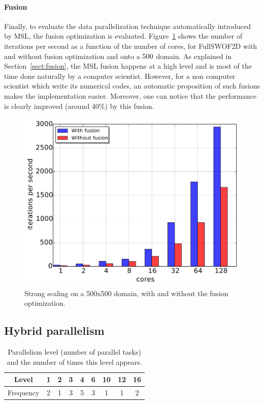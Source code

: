 \paragraph{\textbf{Fusion}} Finally, to evaluate the data parallelization technique automatically introduced by MSL, the fusion optimization is evaluated.
Figure~\ref{fig:fusion} shows the number of iterations per second as a function of the number of cores, for FullSWOF2D with and without fusion optimization and onto a $500 \time 500$ domain. As explained in Section~\ref{sect:fusion}, the MSL fusion happens at a high level and is most of the time done naturally by a computer scientist. However, for a non computer scientist which write its numerical codes, an automatic proposition of such fusions makes the implementation easier. Moreover, one can notice that the performance is clearly improved (around 40\%) by this fusion.

\begin{figure}[!h]\begin{center}
  \includegraphics[width=.6\textwidth]{../results/task_scaling/500_200/fusVSbase.pdf}
  \caption{Strong scaling on a 500x500 domain, with and without the fusion optimization.}
  \label{fig:fusion}
\end{center}\end{figure}

\subsection{Hybrid parallelism}

\begin{table}[th]
 \begin{center}
 \begin{tabular}{|c|c|c|c|c|c|c|c|c|}
    \hline 
   Level & 1 & 2 & 3 & 4 & 6 & 10 & 12 & 16\\
   \hline
   Frequency & 2 & 1 & 3 & 5 & 3 & 1 & 1 & 2\\
   \hline
 \end{tabular}
\caption{Parallelism level (number of parallel tasks) and the number of times this level appears.}
\label{fig:freq}
 \end{center}
\end{table}

